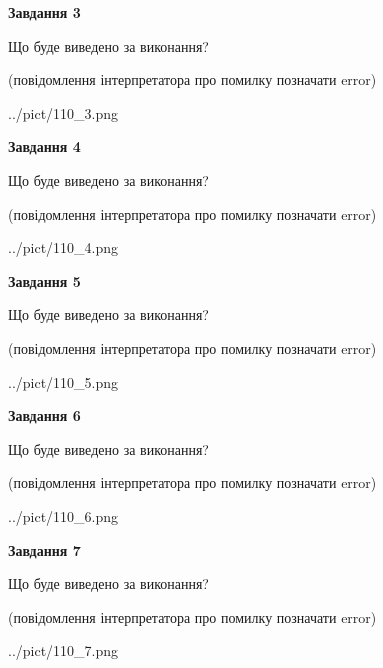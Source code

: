 \documentclass[12pt, ukrainian]{article}
\begin{document}
{\begin {large}
{\begin {center}\textbf{Завдання 3}\end {center}}\par
Що буде виведено за виконання?\par
 (повідомлення інтерпретатора про помилку позначати error)\par
\begin{center}
	{../pict/110_3.png}
\end{center}
\newpage

{\begin {center}\textbf{Завдання 4}\end {center}}\par
Що буде виведено за виконання?\par
 (повідомлення інтерпретатора про помилку позначати error)\par
\begin{center}
	{../pict/110_4.png}
\end{center}
\newpage

{\begin {center}\textbf{Завдання 5}\end {center}}\par
Що буде виведено за виконання?\par
 (повідомлення інтерпретатора про помилку позначати error)\par
\begin{center}
	{../pict/110_5.png}
\end{center}
\newpage

{\begin {center}\textbf{Завдання 6}\end {center}}\par
Що буде виведено за виконання?\par
 (повідомлення інтерпретатора про помилку позначати error)\par
\begin{center}
	{../pict/110_6.png}
\end{center}
\newpage

{\begin {center}\textbf{Завдання 7}\end {center}}\par
Що буде виведено за виконання?\par
 (повідомлення інтерпретатора про помилку позначати error)\par
\begin{center}
	{../pict/110_7.png}
\end{center}
\newpage


\end{large}}
\end{document}
